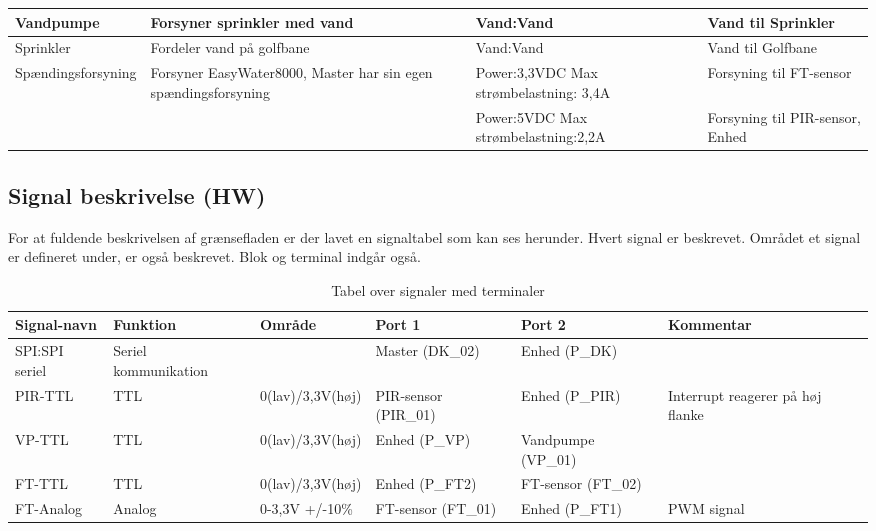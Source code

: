 \begin{table}[H]
\begin{small}
\begin{tabular}{|p{}|p{}|p{}|p{}|}
Vandpumpe & Forsyner sprinkler med vand & Vand:Vand & Vand til Sprinkler \\ \hline
 
Sprinkler & Fordeler vand på golfbane & Vand:Vand & Vand til Golfbane \\ \hline

Spændingsforsyning & Forsyner EasyWater8000, Master har sin egen spændingsforsyning & Power:3,3VDC \newline Max strømbelastning: 3,4A & Forsyning til FT-sensor \\ \cline{3-4}
& & Power:5VDC \newline Max strømbelastning:2,2A		& Forsyning til PIR-sensor, Enhed 	\\ \hline
\end{tabular}
\end{small}
\label{table:Bloktabel}
\end{table}

\begin{table}[H]
\subsection{Signal beskrivelse (HW)}
For at fuldende beskrivelsen af grænsefladen er der lavet en signaltabel som kan ses herunder. Hvert signal er beskrevet. Området et signal er defineret under, er også beskrevet. Blok og terminal indgår også. 
\caption{Tabel over signaler med terminaler}
\begin{small}
\begin{tabular}{|p{2cm}|p{2cm}|p{2cm}|p{2cm}|p{2cm}|p{}|}
\hline

\textbf{Signal-navn}	&\textbf{Funktion} 		&\textbf{Område} &\textbf{Port 1} 	&\textbf{Port 2} 			&\textbf{Kommentar} \\ \hline

SPI:SPI seriel 			&Seriel kommunikation 	& 				&Master (DK\_02)		&Enhed (P\_DK)			&					 \\\hline

PIR-TTL 					&TTL 					&0(lav)\slash3,3V(høj) 	&PIR-sensor (PIR\_01) &Enhed (P\_PIR)			&Interrupt reagerer på høj flanke 					\\\hline
VP-TTL 					&TTL 					&0(lav)\slash3,3V(høj) 	&Enhed (P\_VP)  &Vandpumpe (VP\_01)				&					\\\hline
					
FT-TTL					&TTL						&0(lav)\slash3,3V(høj) 	&Enhed (P\_FT2) &FT-sensor (FT\_02)				&	    				\\\hline
FT-Analog				&Analog 					&0-3,3V 	\newline +/-10\%	&FT-sensor (FT\_01) &Enhed (P\_FT1)				& PWM signal	    				\\\hline

\end{tabular}
\end{small}
\label{table:Signaltabel}
\end{table}